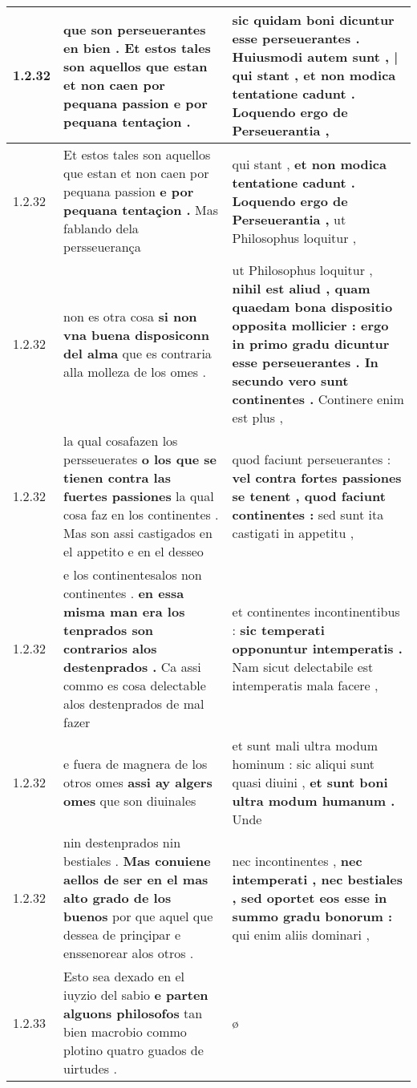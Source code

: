 \begin{tabular}{|p{1cm}|p{6.5cm}|p{6.5cm}|}
1.2.32 & que son perseuerantes en bien . \textbf{ Et estos tales son aquellos que estan et non caen por pequana passion } e por pequana tentaçion . & sic quidam boni dicuntur esse perseuerantes . \textbf{ Huiusmodi autem sunt , | qui stant , } et non modica tentatione cadunt . Loquendo ergo de Perseuerantia , \\\hline
1.2.32 & Et estos tales son aquellos que estan et non caen por pequana passion \textbf{ e por pequana tentaçion . } Mas fablando dela persseuerança & qui stant , \textbf{ et non modica tentatione cadunt . Loquendo ergo de Perseuerantia , } ut Philosophus loquitur , \\\hline
1.2.32 & non es otra cosa \textbf{ si non vna buena disposiconn del alma } que es contraria alla molleza de los omes . & ut Philosophus loquitur , \textbf{ nihil est aliud , quam quaedam bona dispositio opposita mollicier : ergo in primo gradu dicuntur esse perseuerantes . In secundo vero sunt continentes . } Continere enim est plus , \\\hline
1.2.32 & la qual cosafazen los persseuerates \textbf{ o los que se tienen contra las fuertes passiones } la qual cosa faz en los continentes . Mas son assi castigados en el appetito e en el desseo & quod faciunt perseuerantes : \textbf{ vel contra fortes passiones se tenent , quod faciunt continentes : } sed sunt ita castigati in appetitu , \\\hline
1.2.32 & e los continentesalos non continentes . \textbf{ en essa misma man era los tenprados son contrarios alos destenprados . } Ca assi commo es cosa delectable alos destenprados de mal fazer & et continentes incontinentibus : \textbf{ sic temperati opponuntur intemperatis . } Nam sicut delectabile est intemperatis mala facere , \\\hline
1.2.32 & e fuera de magnera de los otros omes \textbf{ assi ay algers omes } que son diuinales & et sunt mali ultra modum hominum : sic aliqui sunt quasi diuini , \textbf{ et sunt boni ultra modum humanum . } Unde \\\hline
1.2.32 & nin destenprados nin bestiales . \textbf{ Mas conuiene aellos de ser en el mas alto grado de los buenos } por que aquel que dessea de prinçipar e enssenorear alos otros . & nec incontinentes , \textbf{ nec intemperati , nec bestiales , sed oportet eos esse in summo gradu bonorum : } qui enim aliis dominari , \\\hline
1.2.33 & Esto sea dexado en el iuyzio del sabio \textbf{ e parten alguons philosofos } tan bien macrobio commo plotino quatro guados de uirtudes . & ø \\\hline

\end{tabular}
